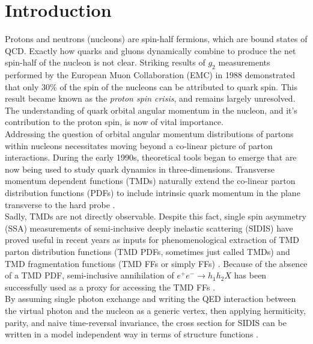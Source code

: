 \chapter{Introduction}

Protons and neutrons (nucleons) are spin-half fermions, which are bound states of QCD.  Exactly how quarks and gluons dynamically combine to produce the net spin-half of the nucleon is not clear.  Striking results of $g_2$ measurements performed by the European Muon Collaboration (EMC) in 1988 \cite{pdfs-leader:1988} demonstrated that only $30\%$ of the spin of the nucleons can be attributed to quark spin.  This result became known as the \textit{proton spin crisis}, and remains largely unresolved.  The understanding of quark orbital angular momentum in the nucleon, and it's contribution to the proton spin, is now of vital importance.  \\

Addressing the question of orbital angular momentum distributions of partons within nucleons necessitates moving beyond a co-linear picture of parton interactions.   During the early 1990s, theoretical tools began to emerge that are now being used to study quark dynamics in three-dimensions.  Transverse momentum dependent functions (TMDs) naturally extend the co-linear parton distribution functions (PDFs) to include intrinsic quark momentum in the plane transverse to the hard probe \cite{tmds-mulders:1995, tmds-bacchetta:2006}.  \\

Sadly, TMDs are not directly observable.  Despite this fact, single spin asymmetry (SSA) measurements of semi-inclusive deeply inelastic scattering (SIDIS) have proved useful in recent years as inputs for phenomenological extraction of TMD parton distribution functions (TMD PDFs, sometimes just called TMDs) and TMD fragmentation functions (TMD FFs or simply FFs) \cite{tmds-airapetian:2009, tmds-airapetian:2012, tmds-aghasyan:2017}.  Because of the absence of a TMD PDF, semi-inclusive annihilation of $e^+ e^- \rightarrow h_1 h_2 X$ has been successfully used as a proxy for accessing the TMD FFs \cite{tmds-anselmino:2015}.  \\

By assuming single photon exchange and writing the QED interaction between the virtual photon and the nucleon as a generic vertex, then applying hermiticity, parity, and naive time-reversal invariance, the cross section for SIDIS can be written in a model independent way in terms of structure functions \cite{tmds-mulders:1995, tmds-bacchetta:2006}.  

